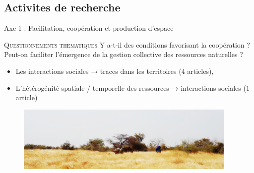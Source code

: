 \documentclass[newPxFont]{beamer}
\begin{document}
%
%

\subsection{Activites de recherche}

\begin{frame}{Axe 1 : Facilitation, coopération et production d'espace}
	\vspace{-2em}
	\small{
		\begin{block}{\textsc{Questionnements thematiques}}
			Y a-t-il des conditions favorisant la coopération ? Peut-on faciliter l'émergence de la gestion collective des ressources naturelles ?
		\end{block}
	}
  \vspace{-1em}
	\begin{itemize}
    \item Les interactions sociales → traces dans les territoires (4 articles),
		\item L'hétérogénité spatiale / temporelle des ressources → interactions sociales (1 article)
	\end{itemize}
  \vspace{-1em}
  \begin{figure}
   			\centering
   				\includegraphics[width=0.95\textwidth]{img/parcelle_gmv}
  \end{figure}
\end{frame}


\end{document}
